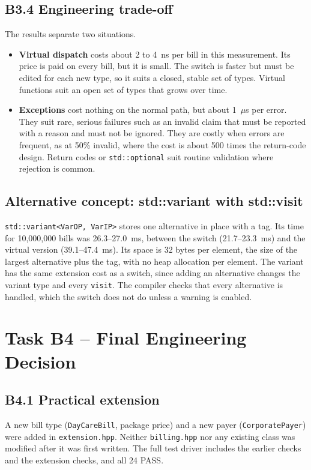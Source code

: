 \documentclass[11pt,a4paper]{article}
\begin{document}
\subsection*{B3.4 Engineering trade-off}
The results separate two situations.
\begin{itemize}[nosep]
\item \textbf{Virtual dispatch} costs about 2 to 4~ns per bill in this measurement. Its price is paid on every bill, but it is small. The switch is faster but must be edited for each new type, so it suits a closed, stable set of types. Virtual functions suit an open set of types that grows over time.
\item \textbf{Exceptions} cost nothing on the normal path, but about 1~$\mu$s per error. They suit rare, serious failures such as an invalid claim that must be reported with a reason and must not be ignored. They are costly when errors are frequent, as at 50\% invalid, where the cost is about 500 times the return-code design. Return codes or \texttt{std::optional} suit routine validation where rejection is common.
\end{itemize}

\subsection*{Alternative concept: std::variant with std::visit}
\texttt{std::variant<VarOP, VarIP>} stores one alternative in place with a tag. Its time for 10{,}000{,}000 bills was 26.3--27.0~ms, between the switch (21.7--23.3~ms) and the virtual version (39.1--47.4~ms). Its space is 32 bytes per element, the size of the largest alternative plus the tag, with no heap allocation per element. The variant has the same extension cost as a switch, since adding an alternative changes the variant type and every \texttt{visit}. The compiler checks that every alternative is handled, which the switch does not do unless a warning is enabled.

\section{Task B4 -- Final Engineering Decision}
\subsection*{B4.1 Practical extension}
A new bill type (\texttt{DayCareBill}, package price) and a new payer (\texttt{CorporatePayer}) were added in \texttt{extension.hpp}. Neither \texttt{billing.hpp} nor any existing class was modified after it was first written. The full test driver includes the earlier checks and the extension checks, and all 24 PASS.
\end{document}
